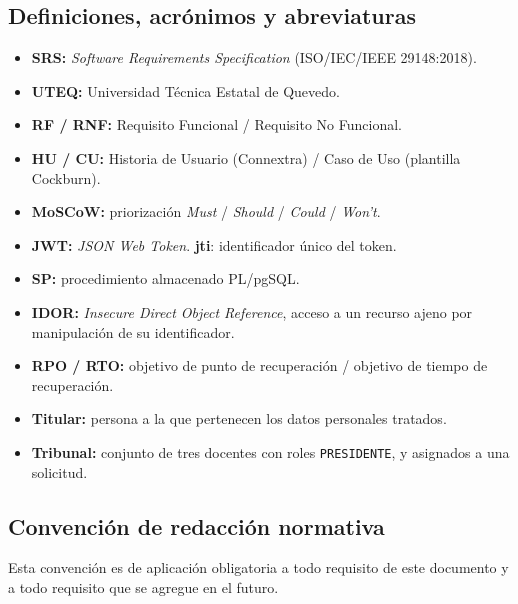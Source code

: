 \documentclass[11pt,a4paper]{article}
\DeclareRobustCommand{\cd}[1]{\texttt{\protect\seqsplit{#1}}}
\begin{document}
\subsection{Definiciones, acrónimos y abreviaturas}
\begin{itemize}
    \item \textbf{SRS:} \emph{Software Requirements Specification} (ISO/IEC/IEEE 29148:2018).
    \item \textbf{UTEQ:} Universidad Técnica Estatal de Quevedo.
    \item \textbf{RF / RNF:} Requisito Funcional / Requisito No Funcional.
    \item \textbf{HU / CU:} Historia de Usuario (Connextra) / Caso de Uso (plantilla Cockburn).
    \item \textbf{MoSCoW:} priorización \emph{Must} / \emph{Should} / \emph{Could} / \emph{Won't}.
    \item \textbf{JWT:} \emph{JSON Web Token}. \textbf{jti}: identificador único del token.
    \item \textbf{SP:} procedimiento almacenado PL/pgSQL.
    \item \textbf{IDOR:} \emph{Insecure Direct Object Reference}, acceso a un recurso ajeno por
          manipulación de su identificador.
    \item \textbf{RPO / RTO:} objetivo de punto de recuperación / objetivo de tiempo de
          recuperación.
    \item \textbf{Titular:} persona a la que pertenecen los datos personales tratados.
    \item \textbf{Tribunal:} conjunto de tres docentes con roles \texttt{PRESIDENTE},
          \cd{VOCAL\_1} y \cd{VOCAL\_2} asignados a una solicitud.
\end{itemize}

\subsection{Convención de redacción normativa}
\label{sec:convencion}

Esta convención es de aplicación obligatoria a todo requisito de este documento y a todo
requisito que se agregue en el futuro.
\end{document}
